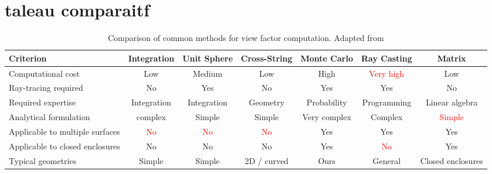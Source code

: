 \section{taleau comparaitf}
\begin{table}[ht]
\centering

\renewcommand{\arraystretch}{1.}
\setlength{\tabcolsep}{3pt}
\scriptsize
\begin{tabular}{p{2.2cm}cccccc}

\textbf{Criterion} &
\textbf{Integration} &
\textbf{Unit Sphere} &
\textbf{Cross-String} &
\textcolor{codegreen}{\textbf{Monte Carlo}} &
\textbf{Ray Casting} &
\textbf{Matrix} \\

\hline
\hline

Computational cost&
Low&
Medium&
Low&
High&
\textcolor{red}{Very high}&
Low\\
\hline

Ray-tracing required &
No&
Yes&
No&
Yes&
Yes&
No\\
\hline

Required expertise &
Integration&
Integration&
Geometry&
Probability&
Programming&
Linear algebra\\
\hline

Analytical formulation &
complex&
Simple&
Simple&
Very complex&
Complex& 
\textcolor{red}{Simple}\\
\hline

Applicable to multiple surfaces &
\textcolor{red}{No}&
\textcolor{red}{No}&
\textcolor{red}{No}&
Yes&
Yes&
Yes\\
\hline

Applicable to closed enclosures &
No&
No&
No&
Yes&
\textcolor{red}{No}&
Yes\\
\hline

Typical geometries &
Simple&
Simple&
2D / curved&
Ours&
General&
Closed enclosures\\
\hline

\end{tabular}\\
\caption{Comparison of common methods for view factor computation. Adapted from \cite{methods_fv}}
\label{tab:methods}
\end{table}